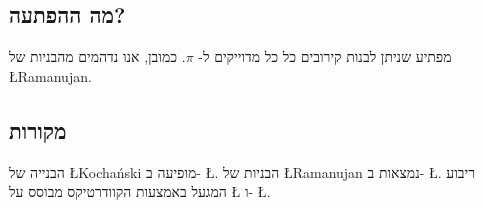 \subsection*{מה ההפתעה?}

מפתיע שניתן לבנות קירובים כל כל מדוייקים ל-%
$\pi$.
כמובן, אנו נדהמים מהבניות של
\L{Ramanujan}.

\subsection*{מקורות}
הבנייה של
\L{Kocha\'{n}ski}
מופיעה ב-%
\L{\cite{bold}}.
הבניות של
\L{Ramanujan}
נמצאות ב-%
\L{\cite{ramanujan1,ramanujan2}}.
ריבוע המגעל באמצעות הקוודרטיקס מבוסס על
\L{\cite[pp.~48--49]{martin}}
ו-%
\L{\cite{wiki:quad}}.
